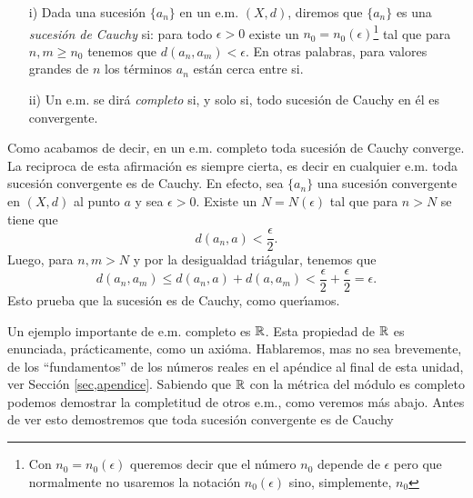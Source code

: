 \begin{definicion}{}
\begin{itemize}
\item[i)]Dada una sucesión $\{a_n\}$ en un e.m. $(X,d)$, diremos que
$\{a_n\}$ es una \emph{sucesión de Cauchy} si: para todo
$\epsilon>0$ existe un $n_0=n_0(\epsilon)$\footnote{Con
$n_0=n_0(\epsilon)$ queremos decir que el número $n_0$ depende
de $\epsilon$ pero que normalmente no usaremos la notación
$n_0(\epsilon)$ sino, simplemente, $n_0$} tal que para $n,m\geq
n_0$ tenemos que $d(a_n,a_m)<\epsilon$. En otras palabras, para
valores grandes de $n$ los términos $a_n$ están cerca entre
si.
\item[ii)] Un e.m. se dirá \emph{completo} si, y solo si, todo
sucesión de Cauchy en él es convergente.
\end{itemize}
\end{definicion}


Como acabamos de decir, en un e.m. completo toda sucesión de
Cauchy converge. La reciproca de esta afirmación es siempre
cierta, es decir en cualquier e.m. toda sucesión convergente es
de Cauchy. En efecto, sea $\{a_n\}$ una sucesión convergente en
$(X,d)$ al punto $a$ y sea  $\epsilon > 0$. Existe un
$N=N(\epsilon)$ tal que para $n>N$ se tiene que
\[
    d(a_n,a)<\frac{\epsilon}{2}.
\]
Luego, para $n,m>N$ y por la desigualdad triágular, tenemos que
\[
    d(a_n,a_m)\leq d(a_n,a)+d(a,a_m)<\frac{\epsilon}{2}+\frac{\epsilon}{2}=\epsilon.
\]
Esto prueba que la sucesión es de Cauchy, como quer\'{\i}amos.

Un ejemplo importante de e.m. completo es $\mathbb{R}$. Esta propiedad de
$\mathbb{R}$ es enunciada, prácticamente, como un axióma. Hablaremos,
mas no sea brevemente, de los ``fundamentos'' de los
 números reales en el apéndice al final de esta unidad, ver
 Sección  \vref{sec,apendice}. Sabiendo que $\mathbb{R}$ con la
 métrica del módulo es completo podemos demostrar la
 completitud de otros e.m., como veremos más abajo. Antes de ver
 esto demostremos que toda sucesión convergente es de Cauchy

